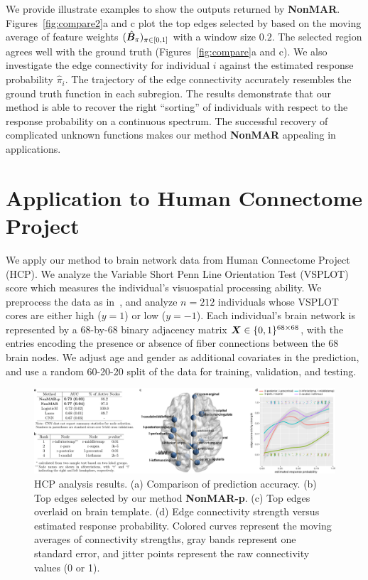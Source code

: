 \documentclass[11pt]{article}
\theoremstyle{definition}
\def\NonparaM{\text{\bf \small NonMAR }}
\begin{document}
We provide illustrate examples to show the outputs returned by {\bf \small NonMAR}. Figures~\ref{fig:compare2}a and c plot the top edges selected by \NonparaM based on the moving average of feature weights $(\hat {\bm B}_\pi)_{\pi\in[0,1]}$ with a window size $0.2$. The selected region agrees well with the ground truth (Figures~\ref{fig:compare}a and c). We also investigate the edge connectivity for individual $i$ against the estimated response probability $\hat \pi_i$. The trajectory of the edge connectivity accurately resembles the ground truth function in each subregion. The results demonstrate that our method is able to recover the right ``sorting'' of individuals with respect to the response probability on a continuous spectrum. 
The successful recovery of complicated unknown functions makes our method {\bf \small NonMAR} appealing in applications. 

\vspace{-.3cm}
\section{Application to Human Connectome Project}
\vspace{-.5cm}

We apply our method to brain network data from Human Connectome Project (HCP). We analyze the Variable Short Penn Line Orientation Test (VSPLOT) score which measures the individual's visuospatial processing ability. We preprocess the data as in~\cite{wang2019common}, and analyze $n=212$ individuals whose VSPLOT cores are either high ($y=1$) or low ($y=-1$). Each individual's brain network is represented by a 68-by-68 binary adjacency matrix $\bm X\in\{0,1\}^{68\times 68}$, with the entries encoding the presence or absence of fiber connections between the 68 brain nodes. We adjust age and gender as additional covariates in the prediction, and use a random 60-20-20 split of the data for training, validation, and testing. 

\begin{figure}[H]
    \centering
       \includegraphics[width=\textwidth]{HCP_combined.pdf}
 \caption{HCP analysis results. (a) Comparison of prediction accuracy. (b) Top edges selected by our method {\scriptsize \bf NonMAR-p}. (c) Top edges overlaid on brain template. (d) Edge connectivity strength versus estimated response probability. Colored curves represent the moving averages of connectivity strengths, gray bands represent one standard error, and jitter points represent the raw connectivity values (0 or 1). }\label{fig:real}
 \vspace{-.7cm}
\end{figure}
\end{document}
